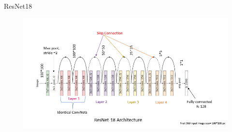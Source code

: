 \documentclass[10pt]{beamer}
\begin{document}
\begin{frame}{ResNet18}
    \begin{figure}
        \centering
        \includegraphics[scale=0.35]{midterm presentation/images/ResNet18.png}
        \label{fig:resnet18}
    \end{figure}
\end{frame}
\end{document}
